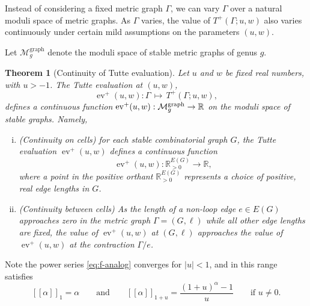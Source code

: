 \documentclass{amsart}
\newtheorem{thm}{Theorem}
\theoremstyle{definition}
\newcommand{\RR}{\mathbb{R}}
\newcommand{\RRpos}{\RR_{>0}}
\DeclareMathOperator{\ev}{ev}
\newcommand{\fanalog}[2]{[\![#2]\!]_{#1}}
\newcommand{\Mgraphg}{\mathcal M_g^{\mathrm{graph}}}
\begin{document}
Instead of considering a fixed metric graph $\Gamma$,
we can 
vary $\Gamma$ over a natural moduli space of metric graphs.
As $\Gamma$ varies, the value of $T^+(\Gamma;u,w)$ also varies continuously under certain mild assumptions on the parameters $(u, w)$.

Let $\Mgraphg$ denote the moduli space of stable metric graphs of genus $g$.
\begin{thm}[Continuity of Tutte evaluation]
\label{thm:tutte-eval-moduli}
	Let $u$ and $w$ be fixed real numbers, with $u > -1$.
	The Tutte evaluation at $(u,w)$,
	\[ \ev^+(u,w) : \Gamma \,\mapsto\, T^+(\Gamma; u,w) ,\]
	defines a continuous function  
	${\rm ev}^+(u,w) : \Mgraphg \to \RR$ on the moduli space of stable graphs.
	Namely, 
	\begin{enumerate}[(i)]
	\item 
	(Continuity on cells)
	for each stable combinatorial graph $G$,
	the Tutte evaluation 
	$\ev^+(u,w) $ 
	defines a continuous function
	\[
		\ev^+(u,w) : \RRpos^{E(G)} \to \RR,
	\]
	where a point in the positive orthant $\RRpos^{E(G)}$
	represents a choice of positive, real edge lengths in $G$.
	
	\item 
	(Continuity between cells)
	As the length of a non-loop edge $e \in E(G)$ approaches zero in the metric graph $\Gamma = (G,\ell)$
	while all other edge lengths are fixed, the value of 
	$\ev^+(u,w)$
	at $(G, \ell)$ %
	approaches the value of $\ev^+(u,w)$ at the contraction 
	$\Gamma / e$. %
	\end{enumerate}
\end{thm}

Note the power series \eqref{eq:f-analog} converges for $|u| < 1$, and in this range satisfies
\[ 
	\fanalog{1}{\alpha} = \alpha
	\qquad\text{and}\qquad
	\fanalog{1 + u}{\alpha} = \frac{(1+u)^\alpha - 1}{u}
	\qquad \text{if } u \neq 0.
\]
\end{document}
